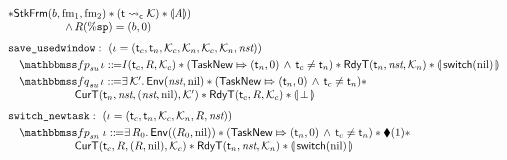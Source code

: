 \begin{figure}[!t]
\[\begin{array}{l}
            \sepstar \RelStkFm{\block}{\fm_1}{\fm_2} 
            \sepstar (\astCurCont{\thrdid}{\hthrdlocalst}) \sepstar 
            \safePrimAst{\primcom}) \\
            \hspace*{5em}
            \, \land \, \RFile(\spreg) = (\block, 0) \\
            \\[-5pt]
            \texttt{save\_usedwindow}: \ 
            (\lgvl = (\thrdid_c, \thrdid_n, \hthrdlocalst_c, \hthrdlocalst_n, 
                \hthrdlocalst_c, \hthrdlocalst_n, \nst)) \\
            \\[-9pt]
            \quad
            \relspecpre_{\textit{su}} \, \lgvl \define 
            I(\thrdid_c, \RFile, \hthrdlocalst_c) \sepstar 
            (\relmsto{\TaskNew}{(\thrdid_n, 0)} \, \land \, \thrdid_c \neq \thrdid_n) 
            \sepstar
            \RelRdyT{\thrdid_n}{\nst}{\hthrdlocalst_n} \sepstar 
            \safePrimAst{\, \primsw(\nil) \,} \\
            \\[-9pt]
            \quad
            \relspecpost_{\textit{su}} \, \lgvl \define 
            \exists \, \hthrdlocalst'. \, 
            \Env{\nst, \nil} \sepstar 
            (\relmsto{\TaskNew}{(\thrdid_n, 0)} \, \land \, \thrdid_c \neq \thrdid_n) \sepstar \\
            \hspace*{6em}
            \RelCurT{\thrdid_n}{\nst}{(\nst, \nil)}{\hthrdlocalst'} 
            \sepstar \RelRdyT{\thrdid_c}{\RFile}{\hthrdlocalst_c}
            \sepstar \safePrimAst{\, \primdone \,}
            \\
            \\[-5pt]
            \texttt{switch\_newtask}: \ (\lgvl = (\thrdid_c, \thrdid_n, \hthrdlocalst_c, 
            \hthrdlocalst_n, \RFile, \nst)) \\
            \\[-9pt]
            \quad 
            \relspecpre_{\textit{sn}} \ \lgvl \define 
            \exists \, \RFile_0. \, \Env{(\RFile_0, \nil)} \sepstar 
            (\relmsto{\TaskNew}{(\thrdid_n, 0)} \, \land \, \thrdid_c \neq \thrdid_n)
            \sepstar \metricAst{1} \sepstar \\
            \hspace*{6em}
            \RelCurT{\thrdid_c}{\RFile}{(\RFile, \nil)}{\hthrdlocalst_c} \sepstar
            \RelRdyT{\thrdid_n}{\nst}{\hthrdlocalst_n} \sepstar 
            \safePrimAst{\, \primsw(\nil) \,} \\

\end{array}\]
\end{figure}

